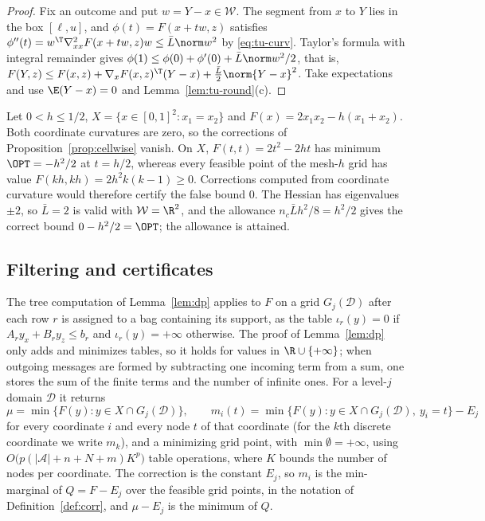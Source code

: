 \begin{proof}
Fix an outcome and put $w=Y-x\in\mathcal W$. The segment from $x$ to $Y$ lies
in the box $[\ell,u]$, and $\phi(t)=F(x+tw,z)$ satisfies
$\phi''(t)=w^{\T}\nabla^2_{xx}F(x+tw,z)w\le\bar L\norm w^2$ by
\eqref{eq:tu-curv}. Taylor's formula with integral remainder gives
$\phi(1)\le\phi(0)+\phi'(0)+\bar L\norm w^2/2$, that is,
$F(Y,z)\le F(x,z)+\nabla_xF(x,z)^{\T}(Y-x)+\frac{\bar L}2\norm{Y-x}^2$.
Take expectations and use $\E(Y-x)=0$ and Lemma~\ref{lem:tu-round}(c).
\end{proof}

\begin{example}\label{ex:tu-fullcurv}
Let $0<h\le1/2$, $X=\{x\in[0,1]^2:x_1=x_2\}$ and
$F(x)=2x_1x_2-h(x_1+x_2)$. Both coordinate curvatures are zero, so the
corrections of Proposition~\ref{prop:cellwise} vanish. On $X$,
$F(t,t)=2t^2-2ht$ has minimum $\OPT=-h^2/2$ at $t=h/2$, whereas every feasible
point of the mesh-$h$ grid has value $F(kh,kh)=2h^2k(k-1)\ge0$. Corrections
computed from coordinate curvature would therefore certify the false bound
$0$. The Hessian has eigenvalues $\pm2$, so $\bar L=2$ is valid with
$\mathcal W=\R^2$, and the allowance $n_c\bar Lh^2/8=h^2/2$ gives the correct
bound $0-h^2/2=\OPT$; the allowance is attained.
\end{example}

\subsection{Filtering and certificates}\label{sec:tu-filter}

The tree computation of Lemma~\ref{lem:dp} applies to $F$ on a grid
$G_j(\mathcal D)$ after each row $r$ is assigned to a bag containing its
support, as the table $\iota_r(y)=0$ if $A_ry_x+B_ry_z\le b_r$ and
$\iota_r(y)=+\infty$ otherwise. The proof of Lemma~\ref{lem:dp} only adds and
minimizes tables, so it holds for values in $\R\cup\{+\infty\}$; when outgoing
messages are formed by subtracting one incoming term from a sum, one stores
the sum of the finite terms and the number of infinite ones. For a level-$j$
domain $\mathcal D$ it returns
\[
\mu=\min\{F(y):y\in X\cap G_j(\mathcal D)\},\qquad
m_i(t)=\min\{F(y):y\in X\cap G_j(\mathcal D),\ y_i=t\}-E_j
\]
for every coordinate $i$ and every node $t$ of that coordinate (for the $k$th
discrete coordinate we write $m_k$), and a minimizing grid point, with $\min\emptyset=+\infty$, using
$O\bigl(p(\lvert\mathcal A\rvert+n+N+m)K^p\bigr)$ table operations, where $K$
bounds the number of nodes per coordinate. The correction is the constant
$E_j$, so $m_i$ is the min-marginal of $Q=F-E_j$ over the feasible grid
points, in the notation of Definition~\ref{def:corr}, and $\mu-E_j$ is the
minimum of $Q$.

